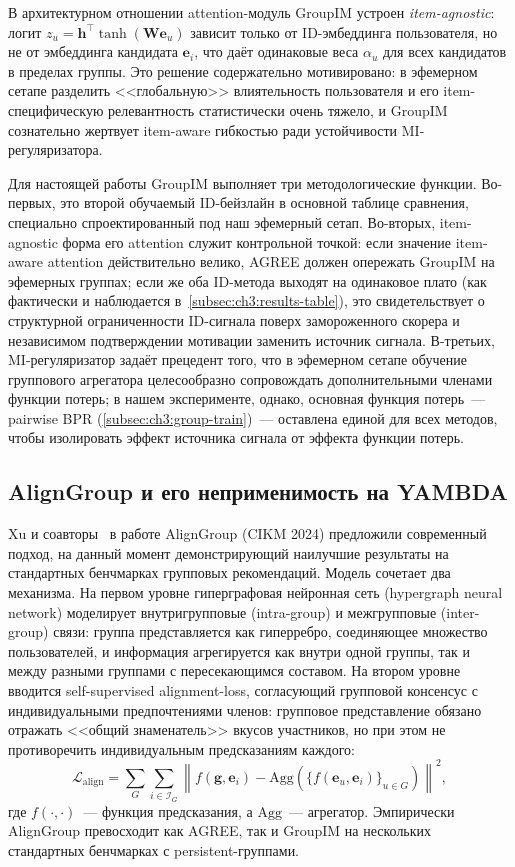 В архитектурном отношении attention-модуль GroupIM устроен \emph{item-agnostic}: логит $z_u = \mathbf{h}^\top \tanh(\mathbf{W}\mathbf{e}_u)$ зависит только от ID-эмбеддинга пользователя, но не от эмбеддинга кандидата $\mathbf{e}_i$, что даёт одинаковые веса $\alpha_u$ для всех кандидатов в пределах группы. Это решение содержательно мотивировано: в эфемерном сетапе разделить <<глобальную>> влиятельность пользователя и его item-специфическую релевантность статистически очень тяжело, и GroupIM сознательно жертвует item-aware гибкостью ради устойчивости MI-регуляризатора.

Для настоящей работы GroupIM выполняет три методологические функции. Во-первых, это второй обучаемый ID-бейзлайн в основной таблице сравнения, специально спроектированный под наш эфемерный сетап. Во-вторых, item-agnostic форма его attention служит контрольной точкой: если значение item-aware attention действительно велико, AGREE должен опережать GroupIM на эфемерных группах; если же оба ID-метода выходят на одинаковое плато (как фактически и наблюдается в~\ref{subsec:ch3:results-table}), это свидетельствует о структурной ограниченности ID-сигнала поверх замороженного скорера и независимом подтверждении мотивации заменить источник сигнала. В-третьих, MI-регуляризатор задаёт прецедент того, что в эфемерном сетапе обучение группового агрегатора целесообразно сопровождать дополнительными членами функции потерь; в нашем эксперименте, однако, основная функция потерь~--- pairwise BPR (\ref{subsec:ch3:group-train})~--- оставлена единой для всех методов, чтобы изолировать эффект источника сигнала от эффекта функции потерь.

\subsection{AlignGroup и его неприменимость на YAMBDA}
\label{subsec:ch2:aligngroup}

Xu и соавторы~\cite{xu2024aligngroup} в работе AlignGroup (CIKM 2024) предложили современный подход, на данный момент демонстрирующий наилучшие результаты на стандартных бенчмарках групповых рекомендаций. Модель сочетает два механизма. На первом уровне гиперграфовая нейронная сеть (hypergraph neural network) моделирует внутригрупповые (intra-group) и межгрупповые (inter-group) связи: группа представляется как гиперребро, соединяющее множество пользователей, и информация агрегируется как внутри одной группы, так и между разными группами с пересекающимся составом. На втором уровне вводится self-supervised alignment-loss, согласующий групповой консенсус с индивидуальными предпочтениями членов: групповое представление обязано отражать <<общий знаменатель>> вкусов участников, но при этом не противоречить индивидуальным предсказаниям каждого:
\begin{equation*}
    \mathcal{L}_{\mathrm{align}} = \sum_{G} \sum_{i \in \mathcal{I}_G} \left\| f(\mathbf{g}, \mathbf{e}_i) - \mathrm{Agg}\!\left( \{ f(\mathbf{e}_u, \mathbf{e}_i) \}_{u \in G} \right) \right\|^2,
\end{equation*}
где $f(\cdot, \cdot)$~--- функция предсказания, а $\mathrm{Agg}$~--- агрегатор. Эмпирически AlignGroup превосходит как AGREE, так и GroupIM на нескольких стандартных бенчмарках с persistent-группами.

